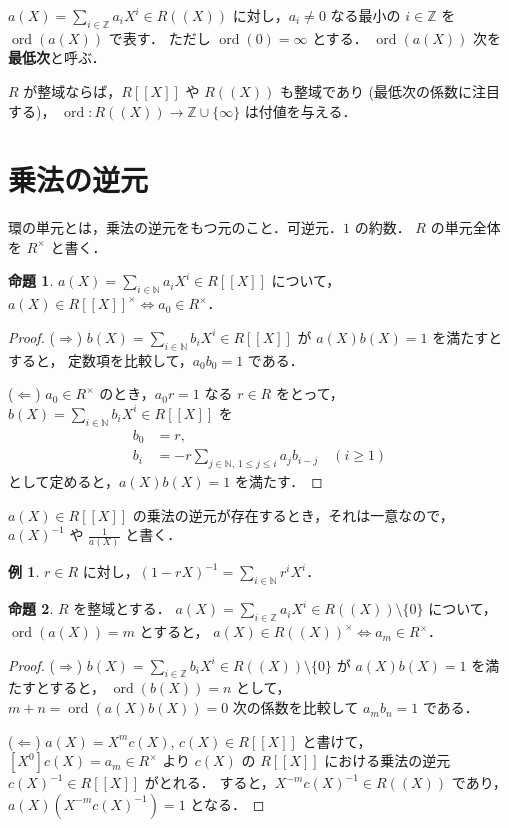 \documentclass{jsarticle}
\DeclareMathOperator{\ord}{ord}
\newcommand{\N}{\mathbb{N}}
\newcommand{\Z}{\mathbb{Z}}
\newcommand{\longto}{\longrightarrow}
\theoremstyle{definition}
\newtheorem*{Exm}{例}
\newtheorem{Prp}{命題}
\newenvironment{exm}{\begin{leftbar}\begin{Exm}}{\end{Exm}\end{leftbar}}
\newenvironment{prp}{\vspace{1ex}\begin{screen}\begin{Prp}}{\end{Prp}\end{screen}}
\newenvironment{prf}{\begin{leftbar}\begin{proof}}{\end{proof}\end{leftbar}}
\begin{document}
$a(X) = \sum_{i\in\Z} a_i X^i \in R((X))$ に対し，$a_i \ne 0$ なる最小の $i \in \Z$ を $\ord(a(X))$ で表す．
ただし $\ord(0) = \infty$ とする．
$\ord(a(X))$ 次を\textbf{最低次}と呼ぶ．

$R$ が整域ならば，$R[[X]]$ や $R((X))$ も整域であり (最低次の係数に注目する)，
$\ord\colon R((X)) \longto \Z \cup \{\infty\}$ は付値を与える．


\section{乗法の逆元}
環の単元とは，乗法の逆元をもつ元のこと．可逆元．$1$ の約数．
$R$ の単元全体を $R^\times$ と書く．

\begin{prp}
  $a(X) = \sum_{i\in\N} a_i X^i \in R[[X]]$ について，
  $a(X) \in R[[X]]^\times \iff a_0 \in R^\times$．
\end{prp}
\begin{prf}
  ($\Longrightarrow$)
  $b(X) = \sum_{i\in\N} b_i X^i \in R[[X]]$ が $a(X) b(X) = 1$ を満たすとすると，
  定数項を比較して，$a_0 b_0 = 1$ である．

  ($\Longleftarrow$)
  $a_0 \in R^\times$ のとき，$a_0 r = 1$ なる $r \in R$ をとって，
  $b(X) = \sum_{i\in\N} b_i X^i \in R[[X]]$ を
  \begin{align*}
    b_0 &= r, \\
    b_i &= -r \sum_{j\in\N,\,1\le j\le i} a_j b_{i-j} \quad (i \ge 1)
  \end{align*}
  として定めると，$a(X) b(X) = 1$ を満たす．
\end{prf}

$a(X) \in R[[X]]$ の乗法の逆元が存在するとき，それは一意なので，
$a(X)^{-1}$ や $\frac{1}{a(X)}$ と書く．

\begin{exm}
  $r \in R$ に対し，$(1 - r X)^{-1} = \sum_{i\in\N} r^i X^i$．
\end{exm}

\begin{prp}
  $R$ を整域とする．
  $a(X) = \sum_{i\in\Z} a_i X^i \in R((X)) \setminus \{0\}$ について，
  $\ord(a(X)) = m$ とすると，
  $a(X) \in R((X))^\times \iff a_m \in R^\times$．
\end{prp}
\begin{prf}
  ($\Longrightarrow$)
  $b(X) = \sum_{i\in\Z} b_i X^i \in R((X)) \setminus \{0\}$ が $a(X) b(X) = 1$ を満たすとすると，
  $\ord(b(X)) = n$ として，
  $m + n = \ord(a(X) b(X)) = 0$ 次の係数を比較して $a_m b_n = 1$ である．

  ($\Longleftarrow$)
  $a(X) = X^m c(X)$, $c(X) \in R[[X]]$ と書けて，
  $[X^0] c(X) = a_m \in R^\times$ より
  $c(X)$ の $R[[X]]$ における乗法の逆元 $c(X)^{-1} \in R[[X]]$ がとれる．
  すると，$X^{-m} c(X)^{-1} \in R((X))$ であり，
  $a(X) (X^{-m} c(X)^{-1}) = 1$ となる．
\end{prf}
\end{document}

